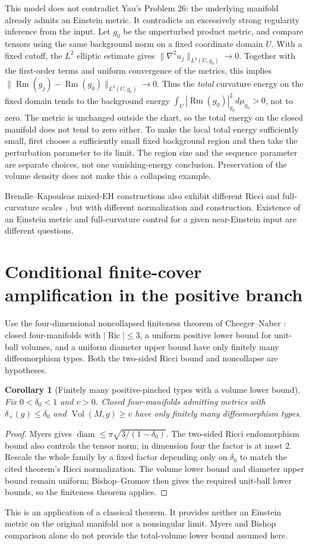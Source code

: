 \documentclass[a4paper,11pt]{article}
\numberwithin{equation}{section}
\newtheorem{corollary}[theorem]{Corollary}
\theoremstyle{definition}
\newcommand{\Ric}{\operatorname{Ric}}
\newcommand{\Rm}{\operatorname{Rm}}
\newcommand{\Vol}{\operatorname{Vol}}
\newcommand{\diam}{\operatorname{diam}}
\begin{document}
This model does not contradict Yau's Problem 26: the underlying manifold already admits an Einstein metric. It contradicts an excessively strong regularity inference from the input.
Let $g_0$ be the unperturbed product metric, and compare tensors using the same background norm on a fixed coordinate domain $U$.
With a fixed cutoff, the $L^2$ elliptic estimate gives
$\|\nabla^2u_j\|_{L^2(U,g_0)}\to0$. Together with the first-order terms and uniform convergence of the metrics, this implies
$\|\Rm(g_j)-\Rm(g_0)\|_{L^2(U,g_0)}\to0$.
Thus the \emph{total} curvature energy on the fixed domain tends to the background energy
$\int_U|\Rm(g_0)|_{g_0}^2d\mu_{g_0}>0$, not to zero.
The metric is unchanged outside the chart, so the total energy on the closed manifold does not tend to zero either.
To make the local total energy sufficiently small, first choose a sufficiently small fixed background region and then take the perturbation parameter to its limit.
The region size and the sequence parameter are separate choices, not one vanishing-energy conclusion.
Preservation of the volume density does not make this a collapsing example.

Brendle--Kapouleas mixed-EH constructions also exhibit different Ricci and full-curvature scales \cite{BK}, but with different normalization and construction. Existence of an Einstein metric and full-curvature control for a given near-Einstein input are different questions.

\section{Conditional finite-cover amplification in the positive branch}\label{sec:coveramplifier}
Use the four-dimensional noncollapsed finiteness theorem of Cheeger--Naber \cite[Theorem 1.12]{CN}: closed four-manifolds with $|\Ric|\le3$, a uniform positive lower bound for unit-ball volumes, and a uniform diameter upper bound have only finitely many diffeomorphism types. Both the two-sided Ricci bound and noncollapse are hypotheses.

\begin{corollary}[Finitely many positive-pinched types with a volume lower bound]
Fix $0<\delta_0<1$ and $v>0$. Closed four-manifolds admitting metrics with
$\delta_+(g)\le\delta_0$ and $\Vol(M,g)\ge v$ have only finitely many diffeomorphism types.
\end{corollary}
\begin{proof}
Myers gives $\diam\le\pi\sqrt{3/(1-\delta_0)}$.
The two-sided Ricci endomorphism bound also controls the tensor norm; in dimension four the factor is at most $2$.
Rescale the whole family by a fixed factor depending only on $\delta_0$ to match the cited theorem's Ricci normalization.
The volume lower bound and diameter upper bound remain uniform; Bishop--Gromov then gives the required unit-ball lower bounds, so the finiteness theorem applies.
\end{proof}
This is an application of a classical theorem. It provides neither an Einstein metric on the original manifold nor a nonsingular limit.
Myers and Bishop comparison alone do not provide the total-volume lower bound assumed here.
\end{document}
